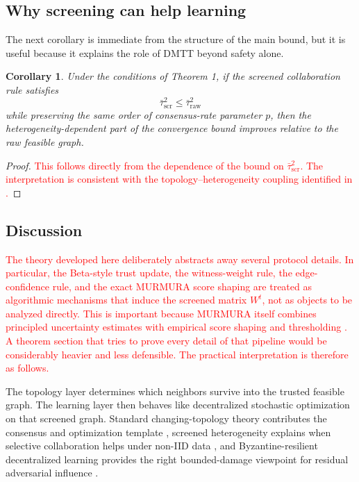 \documentclass[journal]{IEEEtran}
\newtheorem{corollary}[theorem]{Corollary}
\theoremstyle{definition}
\theoremstyle{remark}
\begin{document}
\subsection{Why screening can help learning}

The next corollary is immediate from the structure of the main bound, but it is useful because it explains the role of DMTT beyond safety alone.

\begin{corollary}
Under the conditions of Theorem 1, if the screened collaboration rule satisfies
$$
\bar\tau_{\mathrm{scr}}^2 \le \bar\tau_{\mathrm{raw}}^2
$$
while preserving the same order of consensus-rate parameter $p$, then the heterogeneity-dependent part of the convergence bound improves relative to the raw feasible graph.
\end{corollary}

\begin{proof}
\textcolor{red}{This follows directly from the dependence of the bound on $\bar\tau_{\mathrm{scr}}^2$. The interpretation is consistent with the topology--heterogeneity coupling identified in \cite{le2023refined}.}
\end{proof}

\subsection{Discussion}

\textcolor{red}{The theory developed here deliberately abstracts away several protocol details. In particular, the Beta-style trust update, the witness-weight rule, the edge-confidence rule, and the exact MURMURA score shaping are treated as algorithmic mechanisms that induce the screened matrix $W^t$, not as objects to be analyzed directly. This is important because MURMURA itself combines principled uncertainty estimates with empirical score shaping and thresholding \cite{rangwala2025evidential}. A theorem section that tries to prove every detail of that pipeline would be considerably heavier and less defensible. The practical interpretation is therefore as follows.}

The topology layer determines which neighbors survive into the trusted feasible graph. The learning layer then behaves like decentralized stochastic optimization on that screened graph. Standard changing-topology theory contributes the consensus and optimization template \cite{koloskova2020unified, nedic2014distributed, 7405263}, screened heterogeneity explains when selective collaboration helps under non-IID data \cite{le2023refined}, and Byzantine-resilient decentralized learning provides the right bounded-damage viewpoint for residual adversarial influence \cite{he2022byzantine, 10208131}.
\end{document}
